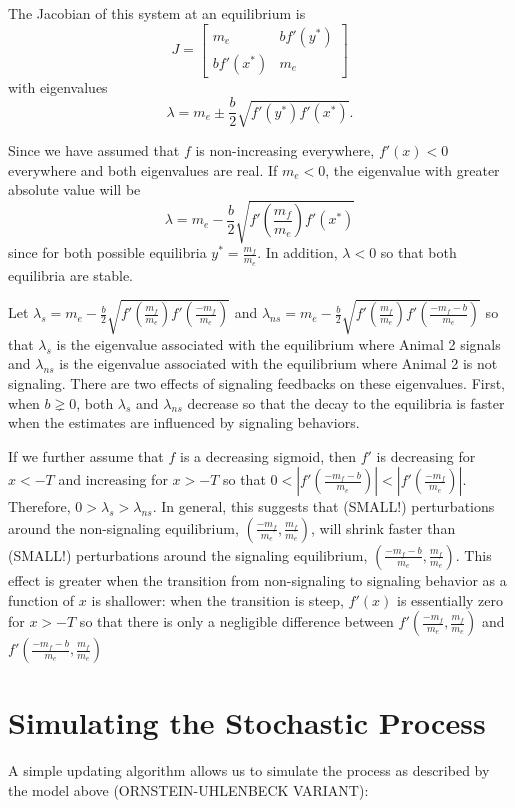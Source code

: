 \documentclass{article}
\begin{document}
The Jacobian of this system at an equilibrium is
$$
J=\left[
\begin{array}{ccccc}
m_e & bf'(y^*) \\
bf'(x^*) & m_e
\end{array}\right] $$
with eigenvalues
$$\lambda=m_e\pm  \frac{b}{2}\sqrt{f'(y^*)f'(x^*)}.$$

Since we have assumed that $f$ is non-increasing everywhere, $f'(x)<0$ everywhere and both eigenvalues are real.  If $m_e<0$, the eigenvalue with greater absolute value will be 
$$\lambda=m_e- \frac{b}{2} \sqrt{f'\left(\frac{m_f}{m_e}\right)f'\left(x^*\right)}$$
since for both possible equilibria $y^*=\frac{m_f}{m_e}$.  In addition, $\lambda<0$ so that both equilibria are stable.


Let $\lambda_s=m_e- \frac{b}{2}\sqrt{f'\left(\frac{m_f}{m_e}\right)f'\left(\frac{-m_f}{m_e}\right)}$ and $\lambda_{ns}=m_e-  \frac{b}{2}\sqrt{f'\left(\frac{m_f}{m_e}\right)f'\left(\frac{-m_f-b}{m_e}\right)}$ so that $\lambda_s$ is the eigenvalue associated with the equilibrium where Animal 2 signals and $\lambda_{ns}$ is the eigenvalue associated with the equilibrium where Animal 2 is not signaling.  There are two effects of signaling feedbacks on these eigenvalues.  First, when $b\gneq 0$, both $\lambda_s$ and $\lambda_{ns}$ decrease so that the decay to the equilibria is faster when the estimates are influenced by signaling behaviors.  


If we further assume that $f$ is a decreasing sigmoid, then $f'$ is decreasing for $x<-T$ and increasing for $x>-T$ so that $0<\left|f'\left(\frac{-m_f-b}{m_e}\right)\right|<\left|f'\left(\frac{-m_f}{m_e}\right)\right|$.  Therefore, $0>\lambda_s>\lambda_{ns}$.  In general, this suggests that (SMALL!) perturbations around the non-signaling equilibrium, $\left(\frac{-m_f}{m_e},\frac{m_f}{m_e}\right)$, will shrink faster than (SMALL!) perturbations around the signaling equilibrium, $\left(\frac{-m_f-b}{m_e},\frac{m_f}{m_e}\right)$.  This effect is greater when the transition from non-signaling to signaling behavior as a function of $x$ is shallower: when the transition is steep, $f'(x)$ is essentially zero for $x>-T$ so that there is only a negligible difference between $f'\left(\frac{-m_f}{m_e},\frac{m_f}{m_e}\right)$ and $f'\left(\frac{-m_f-b}{m_e},\frac{m_f}{m_e}\right)$

\section{Simulating the Stochastic Process }
A simple updating algorithm allows us to simulate the process as described by the model above (ORNSTEIN-UHLENBECK VARIANT):
\end{document}
